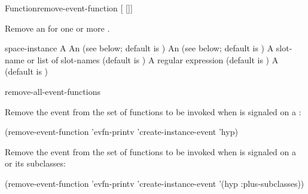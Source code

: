 \documentclass[10pt,twoside,english,pdftex]{article}
\begin{document}

\begin{functiondoc}{Function}{remove-event-function}%
{ [ 
[]] \\
 }
%


\fnsyntax

\fnpurpose Remove an  for one or more .

\fnpackage {}

\fnmodule {}

\fnargs
\begin{args}{space-instance}
\arg[function] A 
 An  
(see below; default is )
 An 
(see below; default is )
 A slot-name or list of slot-names
(default is )
 A  regular expression
(default is \code{(*)})
\arg[permanent] A  (default is \nil)
\end{args}

\fndsyntax
\W\supp\tabletop
\eventclassspec
\subeventingspec
\syntaxsep
\unitclassinstancespec
\subclassingspec

\begin{alsos}{remove-all-event-functions}
\end{alsos}

\fnexamples 
{}%
%
Remove the event   from
the set of functions to be invoked when  is
signaled on a  :
%
\W\supp
\begin{example}
  (remove-event-function 'evfn-printv 'create-instance-event 'hyp)
\end{example}
%
Remove the event   from
the set of functions to be invoked when  is
signaled on a   or its subclasses:
%
\W\supp\notpretop
\begin{example}
  (remove-event-function 'evfn-printv 'create-instance-event '(hyp :plus-subclasses))
\end{example}

\fnnote
\instanceevfnsnyi

\end{functiondoc}
\end{document}
